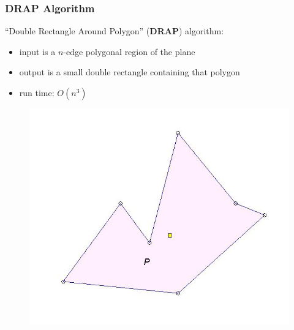 \documentclass[compress]{beamer}
\begin{document}
\begin{frame} \frametitle{DRAP Algorithm}
``Double Rectangle Around Polygon'' (\textbf{DRAP}) algorithm:\\
\begin{itemize}
    \item input is a $n$-edge polygonal region of the plane
    \item output is a small double rectangle containing that polygon
    \item run time: $O(n^3)$
\end{itemize}

    \begin{figure}
    \includegraphics[scale=0.3]{drapP.jpg}
    \end{figure}

\transboxout
\end{frame}
\end{document}
